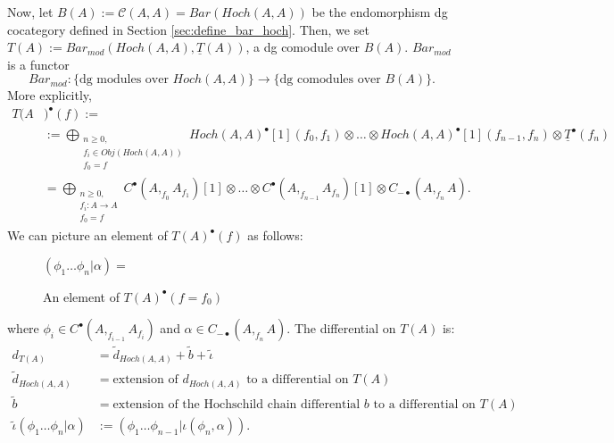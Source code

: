 Now, let $B(A) := \mathcal{C}(A,A) = 
Bar(Hoch(A,A))$ be the 
endomorphism dg cocategory 
defined in Section \ref{sec:define_bar_hoch}. 
Then, we set $T(A):= Bar_{mod}(Hoch(A,A), 
\underline{T}(A))$, a dg comodule over $B(A)$. 
$Bar_{mod}$ is a functor
$$Bar_{mod}: \{\textrm{dg modules over }Hoch(A,A)\} \to 
\{\textrm{dg comodules over }B(A)\}.$$
More explicitly, 
%
\begin{align*}
T(A&)^\bullet(f) := \\
&:= \bigoplus \limits_{\substack{
	n \geq 0,\\
	f_i \in Obj(Hoch(A,A))\\
	f_0 = f}}
Hoch(A,A)^\bullet[1](f_0,f_1) \otimes 
\dots \otimes 
Hoch(A,A)^\bullet[1](f_{n-1},f_n) \otimes 
\underline{T}^\bullet(f_n)\\
&= \bigoplus \limits_{\substack{
	n \geq 0,\\
	f_i:A \to A\\
	f_0 = f}}
C^\bullet(A,  _{f_0}A_{f_1})[1] \otimes \dots \otimes 
C^\bullet(A, _{f_{n-1}}A_{f_n})[1] \otimes 
C_{-\bullet}(A, _{f_n}A ).
\end{align*}
%
We can picture an element of $T(A)^\bullet(f)$ 
as follows:
%
\begin{figure}[H]
\centerline{
$(\phi_1 \dots \phi_n| \alpha) = $
}
\caption{An element of $T(A)^\bullet(f=f_0)$} 
 \label{fig:phi|alpha}
\end{figure}
%
where $\phi_i \in C^\bullet(A, _{f_{i-1}}A_{f_i})$
and $\alpha \in C_{-\bullet}(A, _{f_n}A)$. The 
differential on $T(A)$ is:
%
\begin{align*}
d_{T(A)} 
&=
\tilde{d}_{Hoch(A,A)} + \tilde{b} + \tilde{\iota}\\
%
\tilde{d}_{Hoch(A,A)} 
&=
\textrm{extension of $d_{Hoch(A,A)}$ 
to a differential on $T(A)$}\\
%
\tilde{b}
&=
\textrm{extension of the Hochschild chain 
differential $b$ to a differential on $T(A)$}\\
%
\tilde{\iota}(\phi_1 \dots \phi_n|\alpha) 
&:=
(\phi_1 \dots \phi_{n-1}| \iota(\phi_n, \alpha)).
\end{align*}
